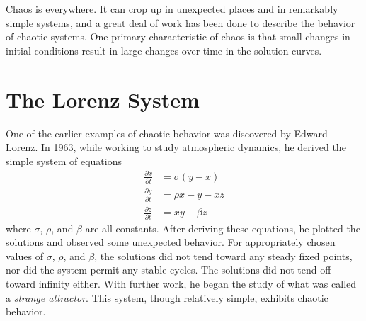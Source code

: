 
Chaos is everywhere.
It can crop up in unexpected places and in remarkably simple systems, and a great deal of work has been done to describe the behavior of chaotic systems.
One primary characteristic of chaos is that small changes in initial conditions result in large changes over time in the solution curves.

\section*{The Lorenz System}
One of the earlier examples of chaotic behavior was discovered by Edward Lorenz.
In 1963, while working to study atmospheric dynamics, he derived the simple system of equations
\begin{align*}
\frac{\partial x}{\partial t} &= \sigma \left(y - x\right) \\
\frac{\partial y}{\partial t} &= \rho x - y - x z \\
\frac{\partial z}{\partial t} &= x y - \beta z
\end{align*}
where $\sigma$, $\rho$, and $\beta$ are all constants.
After deriving these equations, he plotted the solutions and observed some unexpected behavior.
For appropriately chosen values of $\sigma$, $\rho$, and $\beta$, the solutions did not tend toward any steady fixed points, nor did the system permit any stable cycles.
The solutions did not tend off toward infinity either.
With further work, he began the study of what was called a \textit{strange attractor}.
This system, though relatively simple, exhibits chaotic behavior.

